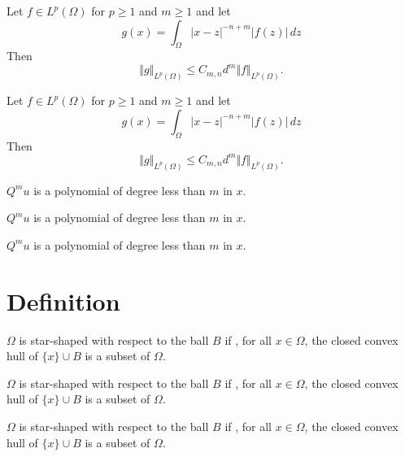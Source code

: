\documentclass[fontset=none]{ctexart}
\begin{document}
\begin{lemma}[xxx]
    Let $f \in L^p(\Omega)$ for $p \ge 1$ and $m \ge 1$ and let
    \[
        g(x) = \int_\Omega |x-z|^{-n+m} |f(z)|\,dz
    \]
    Then
    \begin{equation*}
        \Vert g \Vert_{L^p(\Omega)} \le C_{m,n} d^m \Vert f\Vert_{L^p(\Omega)}.
    \end{equation*}
\end{lemma}

\begin{lemma*}
    Let $f \in L^p(\Omega)$ for $p \ge 1$ and $m \ge 1$ and let
    \[
        g(x) = \int_\Omega |x-z|^{-n+m} |f(z)|\,dz
    \]
    Then
    \begin{equation*}
        \Vert g \Vert_{L^p(\Omega)} \le C_{m,n} d^m \Vert f\Vert_{L^p(\Omega)}.
    \end{equation*}
\end{lemma*}

\begin{claim}
    $Q^m u$ is a polynomial of degree less than $m$ in $x$.
\end{claim}

\begin{claim}[xxx]
    $Q^m u$ is a polynomial of degree less than $m$ in $x$.
\end{claim}

\begin{claim*}
    $Q^m u$ is a polynomial of degree less than $m$ in $x$.
\end{claim*}

\section{Definition}

\begin{definition}
    $\Omega$ is star-shaped with respect to the ball $B$ if , for all $x \in \Omega$, the closed convex hull of $\{x\} \cup B$ is a subset of $\Omega$.
\end{definition}

\begin{definition}[xxx]
    $\Omega$ is star-shaped with respect to the ball $B$ if , for all $x \in \Omega$, the closed convex hull of $\{x\} \cup B$ is a subset of $\Omega$.
\end{definition}

\begin{definition*}
    $\Omega$ is star-shaped with respect to the ball $B$ if , for all $x \in \Omega$, the closed convex hull of $\{x\} \cup B$ is a subset of $\Omega$.
\end{definition*}
\end{document}
